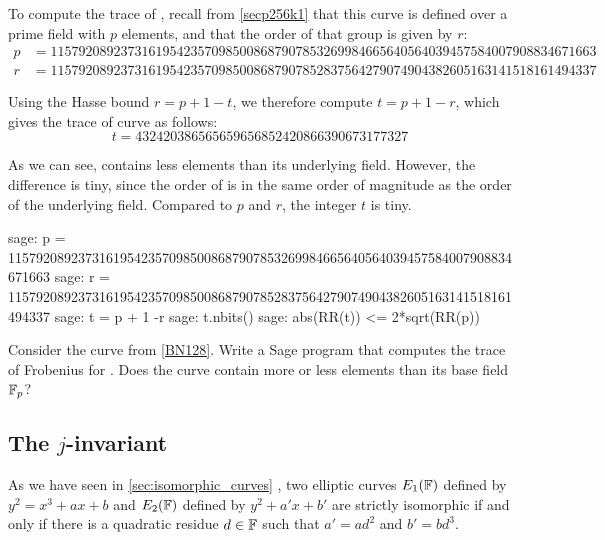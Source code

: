 \begin{example}\label{ex:secp256k1-trace}To compute the trace of , recall from \examplename{} \ref{secp256k1} that this curve is defined over a prime field with $p$ elements, and that the order of that group is given by $r$:  
\begin{align*}
p &= \scriptstyle 115792089237316195423570985008687907853269984665640564039457584007908834671663\\
r &= \scriptstyle 115792089237316195423570985008687907852837564279074904382605163141518161494337
\end{align*}

Using the Hasse bound $r = p + 1 -t$, we therefore compute $t= p+1 -r$, which gives the trace of curve  as follows:
$$
t = \scriptstyle 432420386565659656852420866390673177327
$$

As we can see,  contains less elements than its underlying field. However,  the difference is tiny, since the order of  is in the same order of magnitude as the order of the underlying field. Compared to $p$ and $r$, the integer $t$ is tiny.

\begin{sagecommandline}
sage: p = 115792089237316195423570985008687907853269984665640564039457584007908834671663
sage: r = 115792089237316195423570985008687907852837564279074904382605163141518161494337
sage: t = p + 1 -r
sage: t.nbits()
sage: abs(RR(t)) <= 2*sqrt(RR(p))
\end{sagecommandline}
\end{example} 
\begin{exercise}
\label{exercise:BN128-trace}
Consider the curve  from \examplename{} \ref{BN128}. Write a Sage program that computes the trace of Frobenius for . Does the curve contain more or less elements than its base field $\mathbb{F}_p$?
\end{exercise}

\subsection{The $j$-invariant}
\label{sec:j-inv} As we have seen in \ref{sec:isomorphic_curves} , two elliptic curves $E_1(\mathbb{F})$ defined by $y^2 = x^3 + ax +b$ and $E_2(\mathbb{F})$ defined by $y^2 + a'x + b'$ are strictly isomorphic if and only if there is a quadratic residue $d\in \mathbb{F}$ such that $a' = a d^2$ and $b' = b d^3$. 

